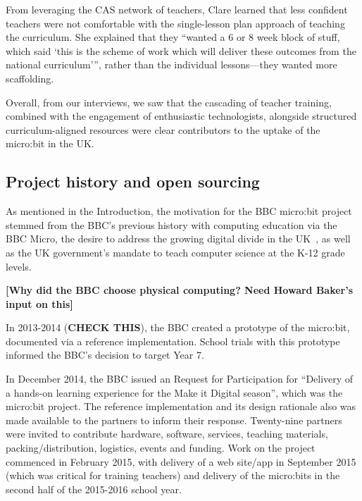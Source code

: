 From leveraging the CAS network of teachers, Clare learned that less confident teachers were not comfortable with the single-lesson plan approach of teaching the curriculum. She explained that they ``wanted a 6 or 8 week block of stuff, which said `this is the scheme of work which will deliver these outcomes from the national curriculum''', rather than the individual lessons---they wanted more scaffolding.

Overall, from our interviews, we saw that the cascading of teacher training, combined with the engagement of enthusiastic technologists, alongside structured curriculum-aligned resources were clear contributors to the uptake of the micro:bit in the UK.

\subsection{Project history and open sourcing}



As mentioned in the Introduction, the motivation for the BBC micro:bit project
stemmed from the BBC's previous history with computing education via the BBC Micro, 
the desire to address the growing digital divide in the UK~\cite{XYZ},
as well as the UK government's mandate to teach computer science at the K-12 grade levels.

{\bf [Why did the BBC choose physical computing? Need Howard Baker's input on this]}

In 2013-2014 ({\bf CHECK THIS}), the BBC created a prototype of the micro:bit, 
documented via a reference implementation. School trials with this prototype 
informed the BBC's decision to target Year 7. 

In December 2014, the BBC issued an Request for Participation
for ``Delivery of a hands-on learning experience for the Make it Digital season'',
which was the micro:bit project.
The reference implementation and
its design rationale also was made available to the partners to inform
their response.
Twenty-nine partners were invited to contribute hardware, software, services,
teaching materials, packing/distribution, logistics, events and funding.
Work on the project commenced in February 2015, with delivery of
a web site/app in September 2015 (which was critical
for training teachers) and delivery of the micro:bits in the second
half of the 2015-2016 school year.

